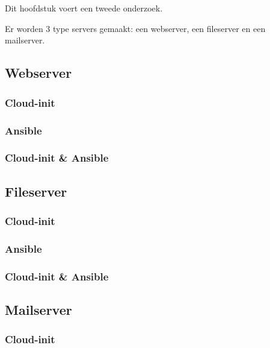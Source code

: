 \chapter{}
\label{ch:serverconf}
Dit hoofdstuk voert een tweede onderzoek.

Er worden 3 type servers gemaakt: een webserver, een fileserver en een mailserver.

\section{Webserver}

\subsection{Cloud-init}

\subsection{Ansible}

\subsection{Cloud-init \& Ansible}

\section{Fileserver}

\subsection{Cloud-init}

\subsection{Ansible}

\subsection{Cloud-init \& Ansible}

\section{Mailserver}

\subsection{Cloud-init}

